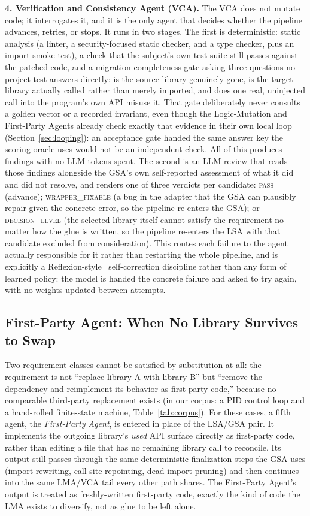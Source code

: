 \textbf{4. Verification and Consistency Agent (VCA).} The VCA does not mutate code; it interrogates it, and it is the only agent that decides whether the pipeline advances, retries, or stops. It runs in two stages. The first is deterministic: static analysis (a linter, a security-focused static checker, and a type checker, plus an import smoke test), a check that the subject's own test suite still passes against the patched code, and a migration-completeness gate asking three questions no project test answers directly: is the source library genuinely gone, is the target library actually called rather than merely imported, and does one real, uninjected call into the program's own API misuse it. That gate deliberately never consults a golden vector or a recorded invariant, even though the Logic-Mutation and First-Party Agents already check exactly that evidence in their own local loop (Section~\ref{sec:looping}): an acceptance gate handed the same answer key the scoring oracle uses would not be an independent check. All of this produces findings with no LLM tokens spent. The second is an LLM review that reads those findings alongside the GSA's own self-reported assessment of what it did and did not resolve, and renders one of three verdicts per candidate: \textsc{pass} (advance); \textsc{wrapper\_fixable} (a bug in the adapter that the GSA can plausibly repair given the concrete error, so the pipeline re-enters the GSA); or \textsc{decision\_level} (the selected library itself cannot satisfy the requirement no matter how the glue is written, so the pipeline re-enters the LSA with that candidate excluded from consideration). This routes each failure to the agent actually responsible for it rather than restarting the whole pipeline, and is explicitly a Reflexion-style~\cite{shinn2023reflexion} self-correction discipline rather than any form of learned policy: the model is handed the concrete failure and asked to try again, with no weights updated between attempts.

\subsection{First-Party Agent: When No Library Survives to Swap}
\label{sec:fra}

Two requirement classes cannot be satisfied by substitution at all: the requirement is not ``replace library A with library B'' but ``remove the dependency and reimplement its behavior as first-party code,'' because no comparable third-party replacement exists (in our corpus: a PID control loop and a hand-rolled finite-state machine, Table~\ref{tab:corpus}). For these cases, a fifth agent, the \emph{First-Party Agent}, is entered in place of the LSA/GSA pair. It implements the outgoing library's \emph{used} API surface directly as first-party code, rather than editing a file that has no remaining library call to reconcile. Its output still passes through the same deterministic finalization steps the GSA uses (import rewriting, call-site repointing, dead-import pruning) and then continues into the same LMA/VCA tail every other path shares. The First-Party Agent's output is treated as freshly-written first-party code, exactly the kind of code the LMA exists to diversify, not as glue to be left alone.


